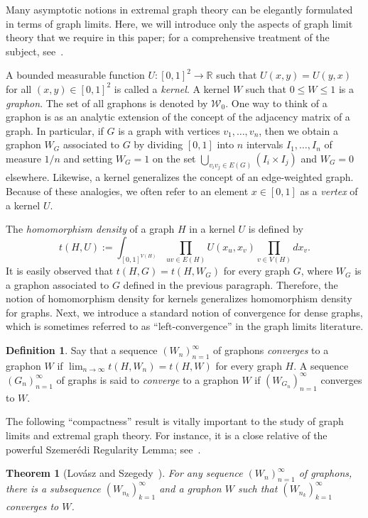 \documentclass[12pt]{article}
\numberwithin{equation}{section}
\newtheorem{thm}[equation]{Theorem}
\theoremstyle{definition}
\newtheorem{defn}[equation]{Definition}
\theoremstyle{remark}
\begin{document}
Many asymptotic notions in extremal graph theory can be elegantly formulated in terms of graph limits. Here, we will introduce only the aspects of graph limit theory that we require in this paper; for a comprehensive treatment of the subject, see~\cite{Lovasz12}. 

A bounded measurable function $U:[0,1]^2\to \mathbb{R}$ such that $U(x,y)=U(y,x)$ for all $(x,y)\in [0,1]^2$ is called a \emph{kernel}. A kernel $W$ such that $0\leq W\leq 1$ is a \emph{graphon}. The set of all graphons is denoted by $\mathcal{W}_0$. One way to think of a graphon is as an analytic extension of the concept of the adjacency matrix of a graph. In particular, if $G$ is a graph with vertices $v_1,\dots,v_n$, then we obtain a graphon $W_G$ associated to $G$ by dividing $[0,1]$ into $n$ intervals $I_1,\dots,I_n$ of measure $1/n$ and setting $W_G=1$ on the set $\bigcup_{v_iv_j\in E(G)}\left(I_i\times I_j\right)$ and $W_G=0$ elsewhere. Likewise, a kernel generalizes the concept of an edge-weighted graph. Because of these analogies, we often refer to an element $x\in[0,1]$ as a \emph{vertex} of a kernel $U$. 

The \emph{homomorphism density} of a graph $H$ in a kernel $U$ is defined by
\[t(H,U):=\int_{[0,1]^{V(H)}}\prod_{uv\in E(H)}U(x_u,x_v)\prod_{v\in V(H)}dx_v.\]
It is easily observed that $t(H,G)=t(H,W_G)$ for every graph $G$, where $W_G$ is a graphon associated to $G$ defined in the previous paragraph. Therefore, the notion of homomorphism density for kernels generalizes homomorphism density for graphs. Next, we introduce a standard notion of convergence for dense graphs, which is sometimes referred to as ``left-convergence'' in the graph limits literature.

\begin{defn}
\label{defn:converges}
Say that a sequence $(W_n)_{n=1}^\infty$ of graphons \emph{converges} to a graphon $W$ if $\lim_{n\to\infty} t(H,W_n)=t(H,W)$ for every graph $H$. A sequence $(G_n)_{n=1}^\infty$ of graphs is said to \emph{converge} to a graphon $W$ if $(W_{G_n})_{n=1}^\infty$ converges to $W$. 
\end{defn}

The following ``compactness'' result is vitally important to the study of graph limits and extremal graph theory. For instance, it is a close relative of the powerful Szemer\'edi Regularity Lemma; see~\cite{LovaszSzegedy07}.

\begin{thm}[Lov\'asz and Szegedy~\cite{LovaszSzegedy06}]
\label{th:LS}
For any sequence $(W_n)_{n=1}^\infty$ of graphons, there is a subsequence $(W_{n_k})_{k=1}^\infty$ and a graphon $W$ such that $(W_{n_k})_{k=1}^\infty$ converges to $W$. 
\end{thm}
\end{document}
